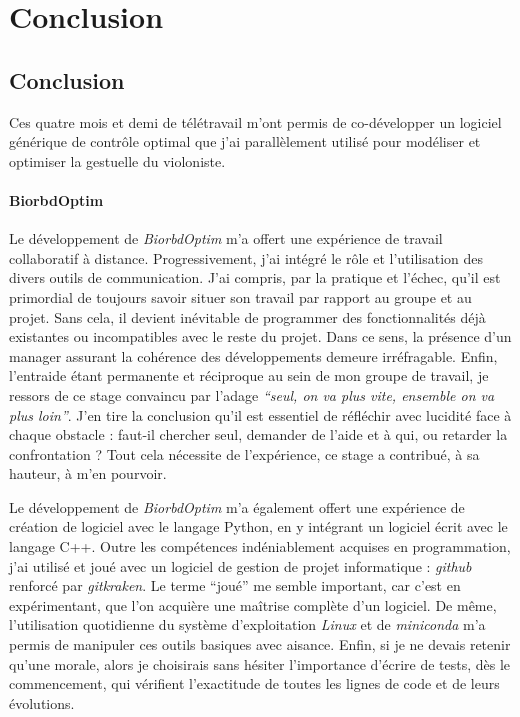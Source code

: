 \part{Conclusion}
    \chapter{Conclusion}
Ces quatre mois et demi de télétravail m'ont permis de co-développer un logiciel générique de contrôle optimal que j'ai parallèlement utilisé pour modéliser et optimiser la gestuelle du violoniste.

    \subsection*{BiorbdOptim}
    
Le développement de \emph{BiorbdOptim} m'a offert une expérience de travail collaboratif à distance. Progressivement, j'ai intégré le rôle et l'utilisation des divers outils de communication. J'ai compris, par la pratique et l'échec, qu'il est primordial de toujours savoir situer son travail par rapport au groupe et au projet. Sans cela, il devient inévitable de programmer des fonctionnalités déjà existantes ou incompatibles avec le reste du projet. Dans ce sens, la présence d'un manager assurant la cohérence des développements demeure irréfragable. Enfin, l'entraide étant permanente et réciproque au sein de mon groupe de travail, je ressors de ce stage convaincu par l'adage \emph{``seul, on va plus vite, ensemble on va plus loin''}. J'en tire la conclusion qu'il est essentiel de réfléchir avec lucidité face à chaque obstacle : faut-il chercher seul, demander de l'aide et à qui, ou retarder la confrontation ? Tout cela nécessite de l'expérience, ce stage a contribué, à sa hauteur, à m'en pourvoir.

Le développement de \emph{BiorbdOptim} m'a également offert une expérience de création de logiciel avec le langage Python, en y intégrant un logiciel écrit avec le langage C++. Outre les compétences indéniablement acquises en programmation, j'ai utilisé et joué avec un logiciel de gestion de projet informatique : \emph{github} renforcé par \emph{gitkraken}. Le terme ``joué'' me semble important, car c'est en expérimentant, que l'on acquière une maîtrise complète d'un logiciel.
De même, l'utilisation quotidienne du système d'exploitation \emph{Linux} et de \emph{miniconda} m'a permis de manipuler ces outils basiques avec aisance. Enfin, si je ne devais retenir qu'une morale, alors je choisirais sans hésiter l'importance d'écrire de tests, dès le commencement, qui vérifient l’exactitude de toutes les lignes de code et de leurs évolutions.

